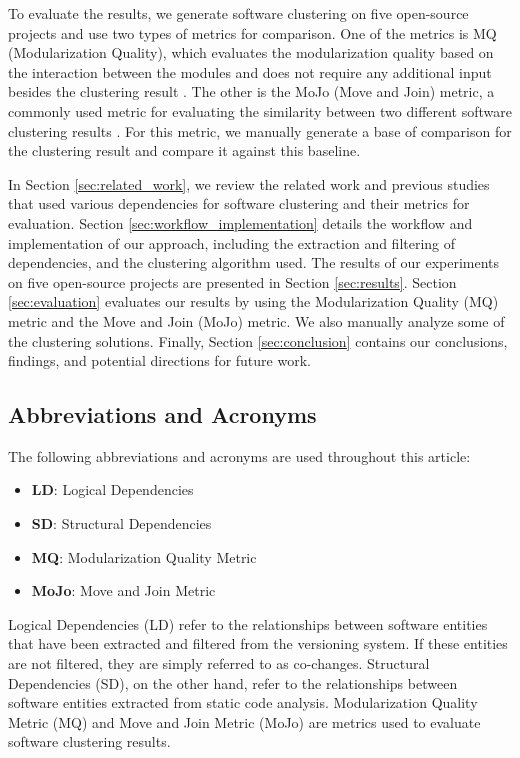 \documentclass{ieeeaccess}
\begin{document}
To evaluate the results, we generate software clustering on five open-source projects and use two types of metrics for comparison. One of the metrics is MQ (Modularization Quality), which evaluates the modularization quality based on the interaction between the modules and does not require any additional input besides the clustering result \cite{b2}. The other is the MoJo (Move and Join) metric, a commonly used metric for evaluating the similarity between two different software clustering results \cite{b3}. For this metric, we manually generate a base of comparison for the clustering result and compare it against this baseline.

In Section \ref{sec:related_work}, we review the related work and previous studies that used various dependencies for software clustering and their metrics for evaluation.
Section \ref{sec:workflow_implementation} details the workflow and implementation of our approach, including the extraction and filtering of dependencies, and the clustering algorithm used.
The results of our experiments on five open-source projects are presented in Section \ref{sec:results}. Section \ref{sec:evaluation} evaluates our results by using the Modularization Quality (MQ) metric and the Move and Join (MoJo) metric. We also manually analyze some of the clustering solutions.
Finally, Section \ref{sec:conclusion} contains our conclusions, findings, and potential directions for future work.

\subsection{Abbreviations and Acronyms}

The following abbreviations and acronyms are used throughout this article:

\begin{itemize}
    \item \textbf{LD}: Logical Dependencies
    \item \textbf{SD}: Structural Dependencies
    \item \textbf{MQ}: Modularization Quality Metric
    \item \textbf{MoJo}: Move and Join Metric
\end{itemize}


Logical Dependencies (LD) refer to the relationships between software entities that have been extracted and filtered from the versioning system. If these entities are not filtered, they are simply referred to as co-changes. 
Structural Dependencies (SD), on the other hand, refer to the relationships between software entities extracted from static code analysis.
Modularization Quality Metric (MQ) and Move and Join Metric (MoJo) are metrics used to evaluate software clustering results.
\end{document}
